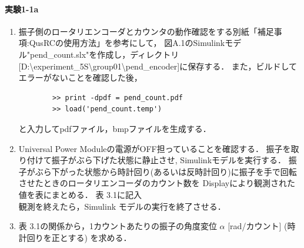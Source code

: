 \paragraph{実験1-1a}
\begin{enumerate}
  \item \quad 振子側のロータリエンコーダとカウンタの動作確認をする別紙「補足事項:QusRCの使用方法」を参考にして，
        図A.1のSimulinkモデル"pend\_count.slx"を作成し，ディレクトリ
        [D:\textbackslash experiment\_5S\textbackslash group01\textbackslash pend\_encoder]に保存する．
        また，ビルドしてエラーがないことを確認した後，
        
        \begin{tcolorbox}[colback=gray!5!white,colframe=gray!75!black]
          \begin{lstlisting}
        >> print -dpdf = pend_count.pdf
        >> load('pend_count.temp')
        \end{lstlisting}
        \end{tcolorbox}
        
        と入力してpdfファイル，bmpファイルを生成する．
        
  \item \quad Universal Power Moduleの電源がOFF担っていることを確認する．
        振子を取り付けて振子がぶら下げた状態に静止させ, Simulinkモデルを実行する．
        振子がぶら下がった状態から時計回り(あるいは反時計回り)に振子を手で回転させたときのロータリエンコーダのカウント数を
        Displayにより観測された値を表にまとめる． 表 3.1に記入 \\
        \quad 観測を終えたら，Simulink モデルの実行を終了させる．
        
  \item \quad 表 3.1の関係から，1カウントあたりの振子の角度変位  \(\alpha \) [rad/カウント] (時計回りを正とする)
        を求める．
        

\end{enumerate}
